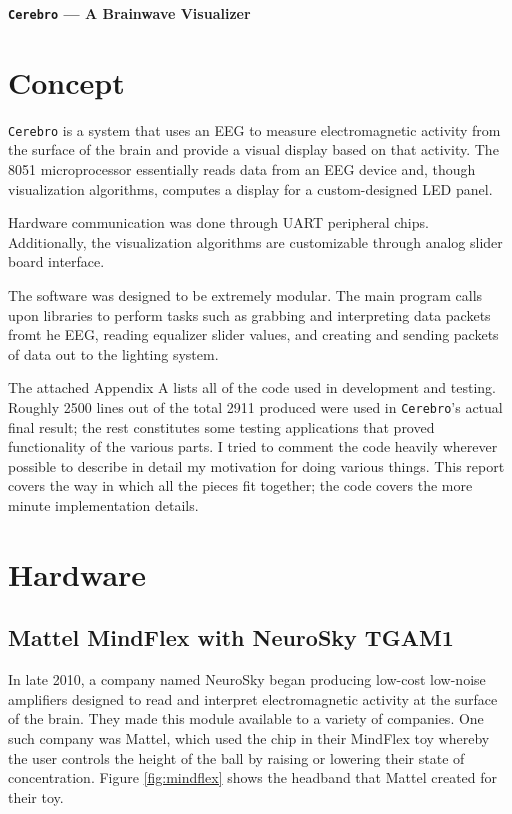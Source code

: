 \documentclass[letterpaper,10pt,notitlepage]{report}
\newcommand{\projname}{\texttt{Cerebro}}
\begin{document}
\begin{center}
	\begin{huge}
		\textbf{\projname{} --- A Brainwave Visualizer}
	\end{huge}
\end{center}

\section{Concept}

    \projname{} is a system that uses an EEG to measure electromagnetic
    activity from the surface of the brain and provide a visual display based
    on that activity.  The 8051 microprocessor essentially reads data from an
    EEG device and, though visualization algorithms, computes a display for a
    custom-designed LED panel.

    Hardware communication was done through UART peripheral chips.
    Additionally, the visualization algorithms are customizable through analog
    slider board interface.

    The software was designed to be extremely modular.  The main program calls
    upon libraries to perform tasks such as grabbing and interpreting data
    packets fromt he EEG, reading equalizer slider values, and creating and
    sending packets of data out to the lighting system.

    The attached Appendix A lists all of the code used in development and
    testing.  Roughly 2500 lines out of the total 2911 produced were used in
    \projname{}'s actual final result; the rest constitutes some testing
    applications that proved functionality of the various parts.  I tried to
    comment the code heavily wherever possible to describe in detail my
    motivation for doing various things.  This report covers the way in which
    all the pieces fit together; the code covers the more minute implementation
    details.

\section{Hardware}

    \subsection{Mattel MindFlex with NeuroSky TGAM1}

        In late 2010, a company named NeuroSky began producing low-cost
        low-noise amplifiers designed to read and interpret electromagnetic
        activity at the surface of the brain.  They made this module available
        to a variety of companies.  One such company was Mattel, which used the
        chip in their MindFlex toy whereby the user controls the height of the
        ball by raising or lowering their state of concentration.  Figure
        \ref{fig:mindflex} shows the headband that Mattel created for their toy.
\end{document}
